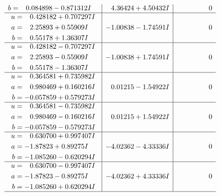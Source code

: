 \documentclass[1p]{elsarticle_modified}
\theoremstyle{definition}
\begin{document}
$$\begin{array}{c|c|c}
\begin{aligned}
b &= \phantom{-}0.084898 - 0.871312 I\end{aligned}
 & \phantom{-}4.36424 + 4.50432 I & \phantom{-0.000000 } 0 \\ \hline\begin{aligned}
u &= \phantom{-}0.428182 + 0.707297 I \\
a &= \phantom{-}2.25893 + 0.55909 I \\
b &= \phantom{-}0.55178 + 1.36307 I\end{aligned}
 & -1.00838 - 1.74591 I & \phantom{-0.000000 } 0 \\ \hline\begin{aligned}
u &= \phantom{-}0.428182 - 0.707297 I \\
a &= \phantom{-}2.25893 - 0.55909 I \\
b &= \phantom{-}0.55178 - 1.36307 I\end{aligned}
 & -1.00838 + 1.74591 I & \phantom{-0.000000 } 0 \\ \hline\begin{aligned}
u &= \phantom{-}0.364581 + 0.735982 I \\
a &= \phantom{-}0.980469 + 0.160216 I \\
b &= -0.057859 + 0.579273 I\end{aligned}
 & \phantom{-}0.01215 - 1.54922 I & \phantom{-0.000000 } 0 \\ \hline\begin{aligned}
u &= \phantom{-}0.364581 - 0.735982 I \\
a &= \phantom{-}0.980469 - 0.160216 I \\
b &= -0.057859 - 0.579273 I\end{aligned}
 & \phantom{-}0.01215 + 1.54922 I & \phantom{-0.000000 } 0 \\ \hline\begin{aligned}
u &= \phantom{-}0.630700 + 0.997407 I \\
a &= -1.87823 + 0.89275 I \\
b &= -1.085260 - 0.620294 I\end{aligned}
 & -4.02362 - 4.33336 I & \phantom{-0.000000 } 0 \\ \hline\begin{aligned}
u &= \phantom{-}0.630700 - 0.997407 I \\
a &= -1.87823 - 0.89275 I \\
b &= -1.085260 + 0.620294 I\end{aligned}
 & -4.02362 + 4.33336 I & \phantom{-0.000000 } 0\\
 \hline 
 \end{array}$$\newpage$$\begin{array}{c|c|c}  

\end{array}$$
\end{document}
